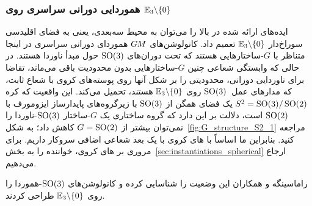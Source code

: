 

\subsubsection*{هموردایی دورانی سراسری روی $\mathbb{E}_3 \backslash \{0\}$}
\label{sec:punctured_euclidean_3dim}

ایده‌های ارائه شده در بالا را می‌توان به محیط سه‌بعدی، یعنی به فضای اقلیدسی سوراخ‌دار $\mathbb{E}_3 \backslash \{0\}$ تعمیم داد.
کانولوشن‌های $G\mkern-1.4muM$ هموردای دورانی سراسری در اینجا متناظر با $G$-ساختارهایی هستند که تحت دوران‌های $\operatorname{SO}(3)$ حول مبدأ ناوردا هستند.
در حالی که وابستگی شعاعی چنین $G$-ساختارهایی بدون محدودیت باقی می‌ماند، تقاضا برای ناوردایی دورانی، محدودیتی را بر شکل آنها روی پوسته‌های کروی با شعاع ثابت، که مدارهای عمل~$\operatorname{SO}(3)$ روی $\mathbb{E}_3 \backslash \{0\}$ هستند، تحمیل می‌کند.
این واقعیت که کره $S^2 = \operatorname{SO}(3)/\operatorname{SO}(2)$ یک فضای همگن از $\operatorname{SO}(3)$ با زیرگروه‌های پایدارساز ایزومورف با $\operatorname{SO}(2)$ است، دلالت بر این دارد که گروه ساختاری یک $G$-ساختار $\operatorname{SO}(3)$-ناوردا را نمی‌توان بیشتر از $G=\operatorname{SO}(2)$ کاهش داد؛ به شکل~\ref{fig:G_structure_S2_1} مراجعه کنید.
بنابراین ما اساساً با های کروی با یک بعد شعاعی اضافی سروکار داریم.
برای مروری بر های کروی، خواننده را به بخش~\ref{sec:instantiations_spherical} ارجاع می‌دهیم.


\cite{ramasinghe2019representation} راماسینگه و همکاران این وضعیت را شناسایی کرده و کانولوشن‌های $\operatorname{SO}(3)$-هموردا را روی $\mathbb{E}_3 \backslash \{0\}$ طراحی کردند.

